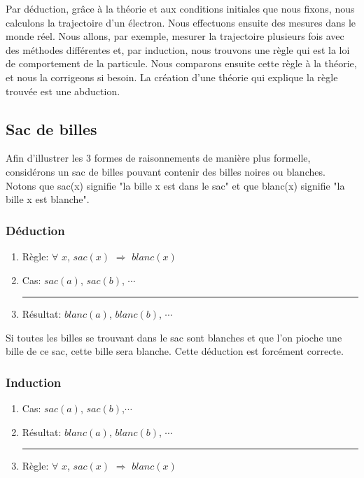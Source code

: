 Par déduction, grâce à la théorie et aux conditions initiales que nous fixons, nous calculons
la trajectoire d'un électron. Nous effectuons ensuite des mesures dans le monde réel. Nous allons, par exemple, mesurer la trajectoire plusieurs fois avec des méthodes différentes et, par induction, nous trouvons une règle qui est la loi de comportement de la particule.
Nous comparons ensuite cette règle à la théorie, et nous la corrigeons si besoin.
La création d'une théorie qui explique la règle trouvée est une abduction.
\\



\subsection{Sac de billes}

Afin d'illustrer les 3 formes de raisonnements de manière plus formelle, considérons un sac de billes pouvant contenir des billes noires ou blanches. Notons que sac(x) signifie "la bille x est dans le sac" et que blanc(x) signifie "la bille x est blanche". \\

\subsubsection{Déduction}

\begin{enumerate}
  \item Règle: $\forall$ $x$, $sac(x)$ $\Rightarrow$ $blanc(x)$
  \item Cas: $sac(a)$, $sac(b)$, $\cdots$\\
  \rule{5.5cm}{.1pt} 
  \item Résultat: $blanc(a)$, $blanc(b)$, $\cdots$
\end{enumerate}

Si toutes les billes se trouvant dans le sac sont blanches et que l'on pioche une bille de ce sac, cette bille sera blanche. Cette déduction est forcément correcte.

\subsubsection{Induction}

\begin{enumerate}
  \item Cas: $sac(a)$, $sac(b)$,$\cdots$
  \item Résultat: $blanc(a)$, $blanc(b)$, $\cdots$\\
  \rule{5.5cm}{.1pt}	
  \item Règle: $\forall$ $x$, $sac(x)$ $\Rightarrow$ $blanc(x)$
\end{enumerate}

